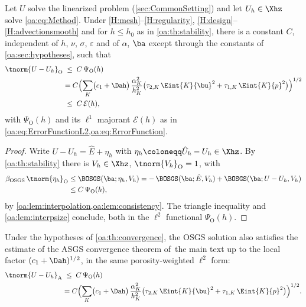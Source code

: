 \begin{theorem}
\label{oa:th:convergence}
Let $U$ solve the linearized problem (\cref{sec:CommonSetting}) and let
$U_h \in \Xhz$ solve \cref{oa:eq:Method}. Under \cref{H:mesh}--\cref{H:regularity}, \cref{H:design}--\cref{H:advectionsmooth} and for
$h \le h_0$ as in \cref{oa:th:stability}, there is a constant $C$, independent of $h$,
$\nu$, $\sigma$, $\varepsilon$ and of $\alpha$, $\ba$ except through the constants of
\cref{oa:sec:hypotheses}, such that
\begin{equation}
  \label{oa:eq:MainResult}
\begin{aligned}
  \tnorm{U - U_h}_{\mathrm{O}}
  &\;\le\;
  C\,\Psi_{\mathrm O}(h) \\
  &= C\Bigl( \sum_K \bigl( c_1 + \Dah \bigr)\,\frac{\alpha_K^2}{h_K^2}
  \bigl( \tau_{2,K}\,\Eint{K}{\bu}^2 + \tau_{1,K}\,\Eint{K}{p}^2 \bigr) \Bigr)^{1/2} \\
  &\;\le\; C\,\mathcal{E}(h),
\end{aligned}
\end{equation}
with $\Psi_{\mathrm O}(h)$ and its $\ell^1$ majorant $\mathcal{E}(h)$ as in
\cref{oa:eq:ErrorFunctionL2,oa:eq:ErrorFunction}.
\end{theorem}

\begin{proof}
Write $U - U_h = \hat E + \eta_h$ with $\eta_h \coloneqq \hat U_h - U_h \in \Xhz$.
By \cref{oa:th:stability} there is $V_h \in \Xhz$, $\tnorm{V_h}_{\mathrm{O}} = 1$, with
\[
\begin{aligned}
  \beta_{\mathrm{OSGS}}\,\tnorm{\eta_h}_{\mathrm{O}}
  &\le \BOSGS(\ba; \eta_h, V_h)
  = -\,\BOSGS(\ba; \hat E, V_h)
  + \BOSGS(\ba; U - U_h, V_h) \\
  &\le C\,\Psi_{\mathrm O}(h),
\end{aligned}
\]
by \cref{oa:lem:interpolation,oa:lem:consistency}. The triangle inequality and
\cref{oa:lem:interpsize} conclude, both in the $\ell^2$ functional $\Psi_{\mathrm O}(h)$.
\end{proof}

\begin{corollary}
\label{oa:cor:asgsnorm}
Under the hypotheses of \cref{oa:th:convergence}, the OSGS solution also satisfies the
estimate of the ASGS convergence theorem of~the main text up to the local factor
$(c_1+\Dah)^{1/2}$, in the same porosity-weighted $\ell^2$ form:
\[
\begin{aligned}
  \tnorm{U - U_h}_{\mathrm{A}}
  &\;\le\;
  C\,\Psi_{\mathrm O}(h) \\
  &= C\Bigl( \sum_K \bigl( c_1 + \Dah \bigr)\,\frac{\alpha_K^2}{h_K^2}
  \bigl( \tau_{2,K}\,\Eint{K}{\bu}^2 + \tau_{1,K}\,\Eint{K}{p}^2 \bigr) \Bigr)^{1/2} .
\end{aligned}
\]
\end{corollary}

